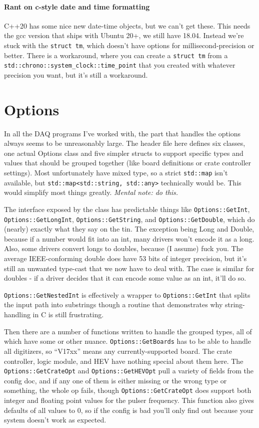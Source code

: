 \paragraph{Rant on c-style date and time formatting}

C++20 has some nice new date-time objects, but we can't get these.
This needs the gcc version that ships with Ubuntu 20+, we still have 18.04.
Instead we're stuck with the \texttt{struct tm}, which doesn't have options for millisecond-precision or better.
There is a workaround, where you can create a \texttt{struct tm} from a \texttt{std::chrono::system\_clock::time\_point} that you created with whatever precision you want, but it's still a workaround.

\section{Options}

In all the DAQ programs I've worked with, the part that handles the options always seems to be unreasonably large.
The header file here defines six classes, one actual Options class and five simpler structs to support specific types and values that should be grouped together (like board definitions or crate controller settings).
Most unfortunately have mixed type, so a strict \texttt{std::map} isn't available, but \texttt{std::map<std::string, std::any>} technically would be.
This would simplify most things greatly.
{\em Mental note: do this.}

The interface exposed by the class has predictable things like \texttt{Options::GetInt}, \texttt{Options::GetLongInt}, \texttt{Options::GetString}, and \texttt{Options::GetDouble}, which do (nearly) exactly what they say on the tin.
The exception being Long and Double, because if a number would fit into an int, many drivers won't encode it as a long.
Also, some drivers convert longs to doubles, because (I assume) fuck you.
The average IEEE-conforming double does have 53 bits of integer precision, but it's still an unwanted type-cast that we now have to deal with.
The case is similar for doubles - if a driver decides that it can encode some value as an int, it'll do so.

\texttt{Options::GetNestedInt} is effectively a wrapper to \texttt{Options::GetInt} that splits the input path into substrings though a routine that demonstrates why string-handling in C is still frustrating.

Then there are a number of functions written to handle the grouped types, all of which have some or other nuance.
\texttt{Options::GetBoards} has to be able to handle all digitizers, so ``V17xx'' means any currently-supported board.
The crate controller, logic module, and HEV have nothing special about them here.
The \texttt{Options::GetCrateOpt} and \texttt{Options::GetHEVOpt} pull a variety of fields from the config doc, and if any one of them is either missing or the wrong type or something, the whole op fails, though \texttt{Options::GetCrateOpt} does support both integer and floating point values for the pulser frequency. This function also gives defaults of all values to 0, so if the config is bad you'll only find out because your system doesn't work as expected.


